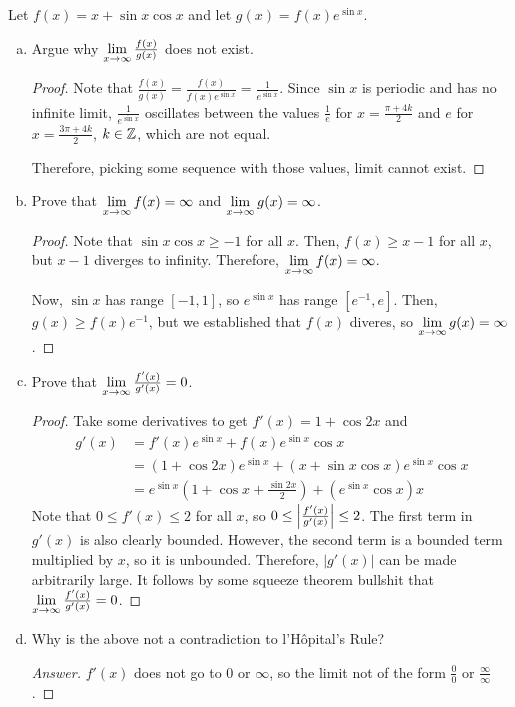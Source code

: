 \documentclass{agony}
\begin{document}
\question Let $f(x) = x + \sin x \cos x$ and let $g(x) = f(x)e^{\sin x}$.
\begin{enumerate}[(a)]
  \item Argue why $\lim\limits_{x\to\infty}\frac{f(x)}{g(x)}$ does not exist.
        \begin{proof}
          Note that $\frac{f(x)}{g(x)} = \frac{f(x)}{f(x)e^{\sin x}} = \frac{1}{e^{\sin x}}$.
          Since $\sin x$ is periodic and has no infinite limit,
          $\frac{1}{e^{\sin x}}$ oscillates between the values
          $\frac{1}{e}$ for $x = \frac{\pi+4k}{2}$ and $e$ for $x = \frac{3\pi+4k}{2}$, $k\in\mathbb{Z}$,
          which are not equal.

          Therefore, picking some sequence with those values, limit cannot exist.
        \end{proof}

  \item Prove that $\lim\limits_{x\to\infty}f(x) = \infty$ and $\lim\limits_{x\to\infty}g(x) = \infty$.
        \begin{proof}
          Note that $\sin x\cos x \geq -1$ for all $x$.
          Then, $f(x) \geq x - 1$ for all $x$, but $x-1$ diverges to infinity.
          Therefore, $\lim\limits_{x\to\infty}f(x) = \infty$.

          Now, $\sin x$ has range $[-1,1]$, so $e^{\sin x}$ has range $[e^{-1},e]$.
          Then, $g(x) \geq f(x)e^{-1}$, but we established that $f(x)$ diveres, so $\lim\limits_{x\to\infty}g(x) = \infty$.
        \end{proof}
  \item Prove that $\lim\limits_{x\to\infty}\frac{f'(x)}{g'(x)} = 0$.
        \begin{proof}
          Take some derivatives to get $f'(x) = 1 + \cos 2x$ and
          \begin{align*}
            g'(x) & = f'(x)e^{\sin x} + f(x)e^{\sin x}\cos x                         \\
                  & = (1 + \cos 2x)e^{\sin x} + (x + \sin x \cos x)e^{\sin x}\cos x  \\
                  & = e^{\sin x}(1 + \cos x + \frac{\sin 2x}{2}) + (e^{\sin x}\cos x)x
          \end{align*}
          Note that $0 \leq f'(x) \leq 2$ for all $x$, so $0 \leq \abs{\frac{f'(x)}{g'(x)}} \leq 2$.
          The first term in $g'(x)$ is also clearly bounded.
          However, the second term is a bounded term multiplied by $x$, so it is unbounded.
          Therefore, $|g'(x)|$ can be made arbitrarily large.
          It follows by some squeeze theorem bullshit that $\lim\limits_{x\to\infty}\frac{f'(x)}{g'(x)} = 0$.
        \end{proof}
  \item Why is the above not a contradiction to l'Hôpital's Rule?
        \begin{proof}[Answer]
          $f'(x)$ does not go to 0 or $\infty$,
          so the limit not of the form $\frac{0}{0}$ or $\frac{\infty}{\infty}$.
        \end{proof}
\end{enumerate}
\end{document}
